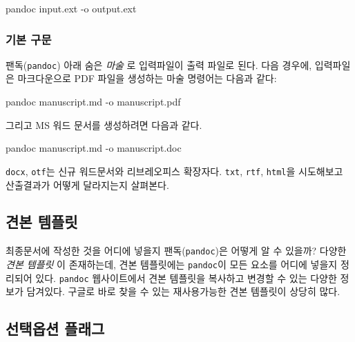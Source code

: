 \documentclass[
  letterpaper,
]{book}
\newenvironment{Shaded}{\begin{snugshade}}{\end{snugshade}}
\newcommand{\AttributeTok}[1]{\textcolor[rgb]{0.40,0.45,0.13}{#1}}
\begin{document}
\begin{Shaded}
\begin{Highlighting}[]
\AttributeTok{pandoc input.ext {-}o output.ext}
\end{Highlighting}
\end{Shaded}

\hypertarget{uxae30uxbcf8-uxad6cuxbb38-1}{%
\subsubsection{기본 구문}\label{uxae30uxbcf8-uxad6cuxbb38-1}}

팬독(\texttt{pandoc}) 아래 숨은 \emph{마술} 로 입력파일이 출력 파일로
된다. 다음 경우에, 입력파일은 마크다운으로 PDF 파일을 생성하는 마술
명령어는 다음과 같다:

\begin{Shaded}
\begin{Highlighting}[]
\AttributeTok{pandoc manuscript.md {-}o manuscript.pdf}
\end{Highlighting}
\end{Shaded}

그리고 MS 워드 문서를 생성하려면 다음과 같다.

\begin{Shaded}
\begin{Highlighting}[]
\AttributeTok{pandoc manuscript.md {-}o manuscript.doc}
\end{Highlighting}
\end{Shaded}

\texttt{docx}, \texttt{otf}는 신규 워드문서와 리브레오피스 확장자다.
\texttt{txt}, \texttt{rtf}, \texttt{html}을 시도해보고 산출결과가 어떻게
달라지는지 살펴본다.

\hypertarget{uxacacuxbcf8-uxd15cuxd50cuxb9bf}{%
\subsection{견본 템플릿}\label{uxacacuxbcf8-uxd15cuxd50cuxb9bf}}

최종문서에 작성한 것을 어디에 넣을지 팬독(\texttt{pandoc})은 어떻게 알
수 있을까? 다양한 \emph{견본 템플릿} 이 존재하는데, 견본 템플릿에는
\texttt{pandoc}이 모든 요소를 어디에 넣을지 정리되어 있다.
\texttt{pandoc} 웹사이트에서 견본 템플릿을 복사하고 변경할 수 있는
다양한 정보가 담겨있다. 구글로 바로 찾을 수 있는 재사용가능한 견본
템플릿이 상당히 많다.

\hypertarget{uxc120uxd0dduxc635uxc158-uxd50cuxb798uxadf8}{%
\subsection{선택옵션
플래그}\label{uxc120uxd0dduxc635uxc158-uxd50cuxb798uxadf8}}
\end{document}
